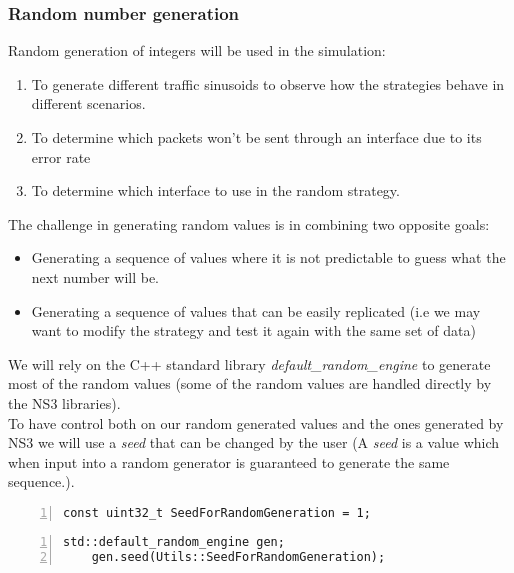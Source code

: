 \subsubsection{Random number generation} \label{rng}
Random generation of integers will be used in the simulation:
\begin{enumerate}
	\item To generate different traffic sinusoids to observe how the strategies behave in different scenarios.
	\item To determine which packets won't be sent through an interface due to its error rate
	\item To determine which interface to use in the random strategy.
\end{enumerate}
The challenge in generating random values is in combining two opposite goals:
\begin{itemize}
	\item Generating a sequence of values where it is not predictable to guess what the next number will be.
	\item Generating a sequence of values that can be easily replicated (i.e we may want to modify the strategy and test it again with the same set of data)
\end{itemize}

We will rely on the C++ standard library \textit{default\_random\_engine} \cite{default_random_engine} to generate most of the random values (some of the random values are handled directly by the NS3 libraries). \\
To have control both on our random generated values and the ones generated by NS3 we will use a \textit{seed} that can be changed by the user (A  \textit{seed} is a value which when input into a random generator is guaranteed to generate the same sequence.). \\
\begin{lstlisting}[numbers=left,xleftmargin=2em,frame=single,framexleftmargin=2em, breaklines, tabsize=2, title=Utils.h]
	const uint32_t SeedForRandomGeneration = 1;
\end{lstlisting}

\begin{lstlisting}[numbers=left,xleftmargin=2em,frame=single,framexleftmargin=2em, breaklines, tabsize=2, title=main.cpp]
	std::default_random_engine gen;
	gen.seed(Utils::SeedForRandomGeneration);
\end{lstlisting}


